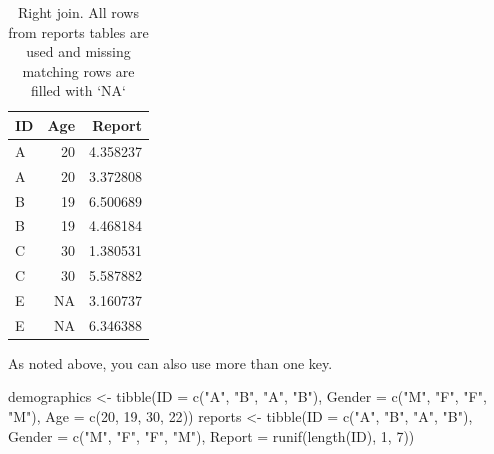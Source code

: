 \documentclass[
]{book}
\newenvironment{Shaded}{\begin{snugshade}}{\end{snugshade}}
\newcommand{\AttributeTok}[1]{\textcolor[rgb]{0.77,0.63,0.00}{#1}}
\newcommand{\DecValTok}[1]{\textcolor[rgb]{0.00,0.00,0.81}{#1}}
\newcommand{\FunctionTok}[1]{\textcolor[rgb]{0.00,0.00,0.00}{#1}}
\newcommand{\NormalTok}[1]{#1}
\newcommand{\OtherTok}[1]{\textcolor[rgb]{0.56,0.35,0.01}{#1}}
\newcommand{\StringTok}[1]{\textcolor[rgb]{0.31,0.60,0.02}{#1}}
\begin{document}
\begin{table}

\caption{\label{tab:unnamed-chunk-187}Right join. All rows from reports tables are used and missing matching rows are filled with `NA`}
\centering
\begin{tabular}[t]{l|r|r}
\hline
ID & Age & Report\\
\hline
A & 20 & 4.358237\\
\hline
A & 20 & 3.372808\\
\hline
B & 19 & 6.500689\\
\hline
B & 19 & 4.468184\\
\hline
C & 30 & 1.380531\\
\hline
C & 30 & 5.587882\\
\hline
E & NA & 3.160737\\
\hline
E & NA & 6.346388\\
\hline
\end{tabular}
\end{table}

As noted above, you can also use more than one key.

\begin{Shaded}
\begin{Highlighting}[]
\NormalTok{demographics }\OtherTok{\textless{}{-}} \FunctionTok{tibble}\NormalTok{(}\AttributeTok{ID =} \FunctionTok{c}\NormalTok{(}\StringTok{"A"}\NormalTok{, }\StringTok{"B"}\NormalTok{, }\StringTok{"A"}\NormalTok{, }\StringTok{"B"}\NormalTok{),}
                       \AttributeTok{Gender =} \FunctionTok{c}\NormalTok{(}\StringTok{"M"}\NormalTok{, }\StringTok{"F"}\NormalTok{, }\StringTok{"F"}\NormalTok{, }\StringTok{"M"}\NormalTok{),}
                       \AttributeTok{Age =} \FunctionTok{c}\NormalTok{(}\DecValTok{20}\NormalTok{, }\DecValTok{19}\NormalTok{, }\DecValTok{30}\NormalTok{, }\DecValTok{22}\NormalTok{))}
\NormalTok{reports }\OtherTok{\textless{}{-}} \FunctionTok{tibble}\NormalTok{(}\AttributeTok{ID =} \FunctionTok{c}\NormalTok{(}\StringTok{"A"}\NormalTok{, }\StringTok{"B"}\NormalTok{, }\StringTok{"A"}\NormalTok{, }\StringTok{"B"}\NormalTok{),}
                  \AttributeTok{Gender =} \FunctionTok{c}\NormalTok{(}\StringTok{"M"}\NormalTok{, }\StringTok{"F"}\NormalTok{, }\StringTok{"F"}\NormalTok{, }\StringTok{"M"}\NormalTok{),}
                  \AttributeTok{Report =} \FunctionTok{runif}\NormalTok{(}\FunctionTok{length}\NormalTok{(ID), }\DecValTok{1}\NormalTok{, }\DecValTok{7}\NormalTok{))}
\end{Highlighting}
\end{Shaded}
\end{document}
